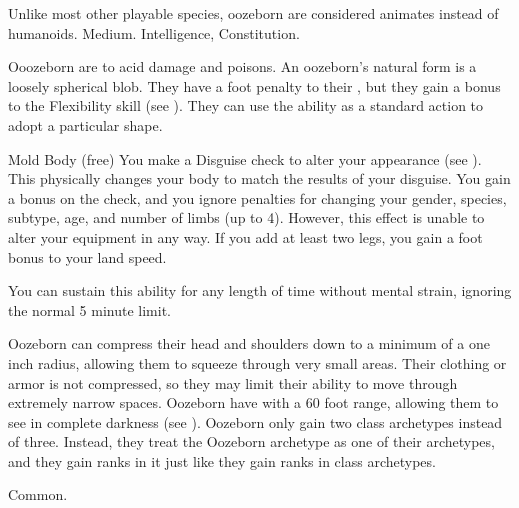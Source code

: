          Unlike most other playable species, oozeborn are considered animates instead of humanoids.
         Medium.
          Intelligence,  Constitution.
        \begin{itemize}
             Ooozeborn are  to acid damage and poisons.
             An oozeborn's natural form is a loosely spherical blob.
                They have a  foot penalty to their , but they gain a  bonus to the Flexibility skill (see ).
                They can use the  ability as a standard action to adopt a particular shape.
                \begin{sustainability}{Mold Body}{ (free)}
                    \rankline
                    You make a Disguise check to alter your appearance (see ).
                    This physically changes your body to match the results of your disguise.
                    You gain a  bonus on the check, and you ignore penalties for changing your gender, species, subtype, age, and number of limbs (up to 4).
                    However, this effect is unable to alter your equipment in any way.
                    If you add at least two legs, you gain a  foot bonus to your land speed.

                    You can sustain this ability for any length of time without mental strain, ignoring the normal 5 minute limit.
                \end{sustainability}
             Oozeborn can compress their head and shoulders down to a minimum of a one inch radius, allowing them to squeeze through very small areas.
                Their clothing or armor is not compressed, so they may limit their ability to move through extremely narrow spaces.
             Oozeborn have  with a 60 foot range, allowing them to see in complete darkness (see ).
             Oozeborn only gain two class archetypes instead of three.
                Instead, they treat the Oozeborn archetype as one of their archetypes, and they gain ranks in it just like they gain ranks in class archetypes.
        \end{itemize}
         Common.
        
